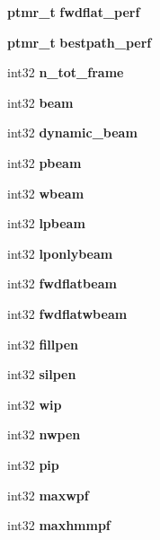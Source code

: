 \begin{DoxyCompactItemize}
\item 
{\bf ptmr\-\_\-t} {\bfseries fwdflat\-\_\-perf}\label{structngram__search__s_a9af672c28dfc39bdfa5dd8e7e9e54989}

\item 
{\bf ptmr\-\_\-t} {\bfseries bestpath\-\_\-perf}\label{structngram__search__s_a67d755fd060de20d50c1a2d237618917}

\item 
int32 {\bfseries n\-\_\-tot\-\_\-frame}\label{structngram__search__s_a45baee2d3862a81cc21946a9602317be}

\item 
int32 {\bfseries beam}\label{structngram__search__s_a7f93fc812f623bcad2d1d8d14724ab52}

\item 
int32 {\bfseries dynamic\-\_\-beam}\label{structngram__search__s_ae6ad22c96dc7d709f529dfaa355a47a2}

\item 
int32 {\bfseries pbeam}\label{structngram__search__s_a096243fad532d780754e64ffb0a52d9c}

\item 
int32 {\bfseries wbeam}\label{structngram__search__s_a443510527cfba0cb4010a0deb09480c2}

\item 
int32 {\bfseries lpbeam}\label{structngram__search__s_ab708267dd98bbc156038b8b99b716ee7}

\item 
int32 {\bfseries lponlybeam}\label{structngram__search__s_ab51f51a73bbce696f9ac912131db0753}

\item 
int32 {\bfseries fwdflatbeam}\label{structngram__search__s_a251365027c09b72a43a9be9a161100b0}

\item 
int32 {\bfseries fwdflatwbeam}\label{structngram__search__s_a6178f10c6de4f77ac6a660ad31fbbd77}

\item 
int32 {\bfseries fillpen}\label{structngram__search__s_a2b791bfa3cc372e30d844a687ceea3d2}

\item 
int32 {\bfseries silpen}\label{structngram__search__s_ab2cbba86475a85836abf87faee4745dc}

\item 
int32 {\bfseries wip}\label{structngram__search__s_a1e198579ab46c7de67d8b3eb1e1bf2ec}

\item 
int32 {\bfseries nwpen}\label{structngram__search__s_a194ea45ae0b6866cb0a734061c5224e8}

\item 
int32 {\bfseries pip}\label{structngram__search__s_a854e8b60f779a4201aab3788943e7f76}

\item 
int32 {\bfseries maxwpf}\label{structngram__search__s_ae40b3a2caa5bbb523cce35dda4290d02}

\item 
int32 {\bfseries maxhmmpf}\label{structngram__search__s_a75f2eeaedf27926e9d0b76a23acbc9ff}

\end{DoxyCompactItemize}


